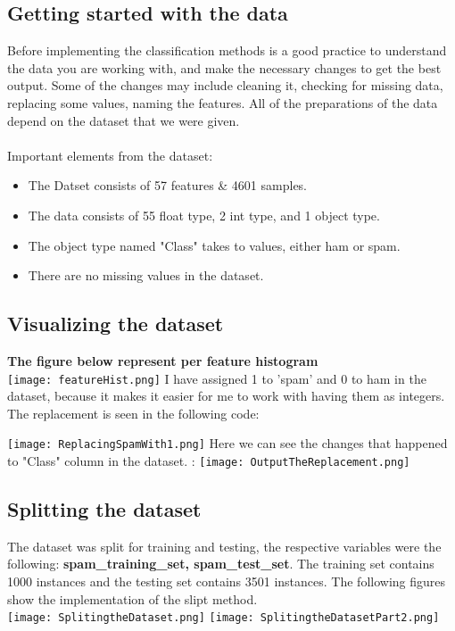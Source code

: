 \documentclass{article}
\begin{document}
\subsection{Getting started with the data}

Before implementing the classification methods is a good practice to understand the data you are working with, and make the necessary changes to get the best output. Some of the changes may include cleaning it, checking for missing data, replacing some values, naming the features. All of the preparations of the data depend on the dataset that we were given. \\
\\
Important elements from the dataset: 
\begin{itemize}
    \item The Datset consists of 57 features & 4601 samples.
    \item The data consists of 55 float type, 2 int type, and 1 object type.
    \item The object type named "Class" takes to values, either ham or spam. 
    \item  There are no missing values in the dataset.
\end{itemize}

\subsection{Visualizing the dataset}

\centering
\textbf{The figure below represent per feature histogram}
\\
\centering
\texttt{[image: featureHist.png]}
\;
I have assigned 1 to 'spam' and 0 to ham in the dataset, because it makes it easier for me to work with having them as integers. The replacement is seen in the following code:

\texttt{[image: ReplacingSpamWith1.png]}
\;
Here we can see the changes that happened to "Class" column  in the dataset.
\hspace{1cm}:
\texttt{[image: OutputTheReplacement.png]}

\subsection{Splitting the dataset }
The dataset was split for training and testing, the respective variables were the following: 
\textbf{spam\_training\_set, spam\_test\_set}. The training set contains 1000 instances and the testing set contains 3501 instances. The following figures show the implementation of the slipt method. 
\\
\;
\texttt{[image: SplitingtheDataset.png]}
\;
\texttt{[image: SplitingtheDatasetPart2.png]}
\end{document}
